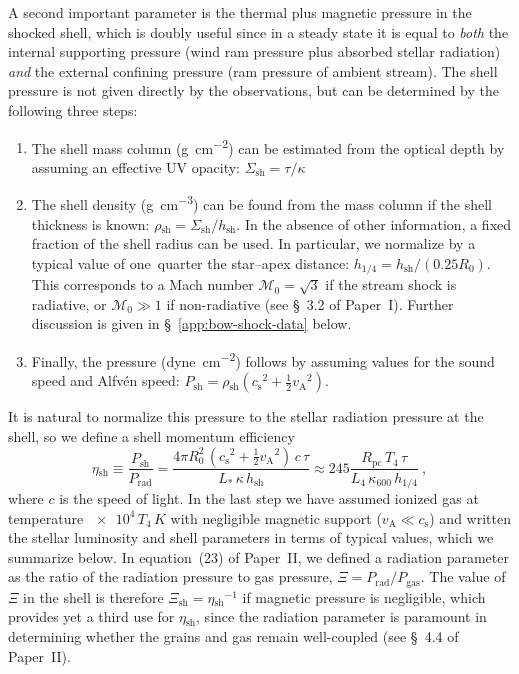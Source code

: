 \documentclass[useAMS, usenatbib, a4paper]{mnras}
\newcommand{\alfven}{\ensuremath{_{\scriptscriptstyle\text{A}}}}
\newcommand{\gas}{\ensuremath{_{\text{gas}}}}
\newcommand\rad{\ensuremath{_{\text{rad}}}}
\newcommand\sound{\ensuremath{c_{\text{s}}}}
\newcommand\shell{\ensuremath{_{\text{sh}}}}
\newcommand\M{\ensuremath{\mathcal{M}}}
\begin{document}
A second important parameter is the thermal plus magnetic pressure in
the shocked shell, which is doubly useful since in a steady state it
is equal to \emph{both} the internal supporting pressure (wind ram
pressure plus absorbed stellar radiation) \emph{and} the external
confining pressure (ram pressure of ambient stream).  The shell
pressure is not given directly by the observations, but can be
determined by the following three steps:
\begin{enumerate}[P1.]
\item \label{P1} The shell mass column (\si{g.cm^{-2}}) can be
  estimated from the optical depth by assuming an effective UV
  opacity: \(\Sigma\shell = \tau / \kappa\)
\item \label{P2} The shell density (\si{g.cm^{-3}}) can be found from
  the mass column if the shell thickness is known:
  \(\rho\shell = \Sigma\shell / h\shell\).  In the absence of other information, a
  fixed fraction of the shell radius can be used.  In particular, we
  normalize by a typical value of one~quarter the star--apex distance:
  \(h_{1/4} = h\shell / (0.25 R_0)\).  This corresponds to a Mach
  number \(\M_0 = \surd 3\) if the stream shock is radiative, or
  \(\M_0 \gg 1\) if non-radiative (see \S~3.2 of Paper~I). Further
  discussion is given in \S~\ref{app:bow-shock-data} below. 
\item \label{P3} Finally, the pressure (\si{dyne.cm^{-2}}) follows by
  assuming values for the sound speed and Alfvén speed:
  \(P\shell = \rho\shell (\sound^2 + \frac12 v\alfven^2) \).
\end{enumerate}
It is natural to normalize this pressure to the stellar radiation
pressure at the shell, so we define a shell momentum efficiency
\newcommand\pc{\ensuremath{_{\text{pc}}}}
\begin{equation}
  \label{eq:eta-shell}
  \eta\shell \equiv \frac{P\shell}{P\rad}
  = \frac{4\pi R_0^2\, (\sound^2 + \frac12 v\alfven^2)\, c\, \tau}{L_*\, \kappa\, h\shell}
  \approx 245 \frac{R\pc \, T_4 \, \tau}{L_4 \, \kappa_{600} \, h_{1/4}} \ , 
\end{equation}
where \(c\) is the speed of light. In the last step we have assumed
ionized gas at temperature \(\num{e4}\,T_4\,\si{K}\) with negligible
magnetic support (\(v\alfven \ll \sound\)) and written the stellar
luminosity and shell parameters in terms of typical values, which we
summarize below.  In equation~(23) of Paper~II, we defined a radiation
parameter as the ratio of the radiation pressure to gas pressure,
\(\Xi = P\rad/P\gas\). The value of \(\Xi\) in the shell is therefore
\(\Xi\shell = \eta\shell^{-1}\) if magnetic pressure is negligible, which
provides yet a third use for \(\eta\shell\), since the radiation
parameter is paramount in determining whether the grains and gas
remain well-coupled (see \S~4.4 of Paper~II).
\end{document}
